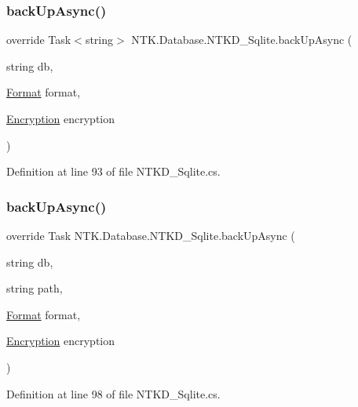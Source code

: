 \subsubsection{\texorpdfstring{backUpAsync()}{backUpAsync()}\hspace{0.1cm}{\footnotesize\ttfamily [1/2]}}
{\footnotesize\ttfamily override Task$<$string$>$ N\+T\+K.\+Database.\+N\+T\+K\+D\+\_\+\+Sqlite.\+back\+Up\+Async (\begin{DoxyParamCaption}\item[{string}]{db,  }\item[{\mbox{\hyperlink{namespace_n_t_k_1_1_database_a9bed700210ca4ed5854002637b664789}{Format}}}]{format,  }\item[{\mbox{\hyperlink{namespace_n_t_k_1_1_database_aa21afe93187a6c77c4ccdc988b3c4ac2}{Encryption}}}]{encryption }\end{DoxyParamCaption})}



Definition at line 93 of file N\+T\+K\+D\+\_\+\+Sqlite.\+cs.

\mbox{\label{class_n_t_k_1_1_database_1_1_n_t_k_d___sqlite_a0340b672129a87c96b5f6bea8839a01c}} 
\subsubsection{\texorpdfstring{backUpAsync()}{backUpAsync()}\hspace{0.1cm}{\footnotesize\ttfamily [2/2]}}
{\footnotesize\ttfamily override Task N\+T\+K.\+Database.\+N\+T\+K\+D\+\_\+\+Sqlite.\+back\+Up\+Async (\begin{DoxyParamCaption}\item[{string}]{db,  }\item[{string}]{path,  }\item[{\mbox{\hyperlink{namespace_n_t_k_1_1_database_a9bed700210ca4ed5854002637b664789}{Format}}}]{format,  }\item[{\mbox{\hyperlink{namespace_n_t_k_1_1_database_aa21afe93187a6c77c4ccdc988b3c4ac2}{Encryption}}}]{encryption }\end{DoxyParamCaption})}



Definition at line 98 of file N\+T\+K\+D\+\_\+\+Sqlite.\+cs.

